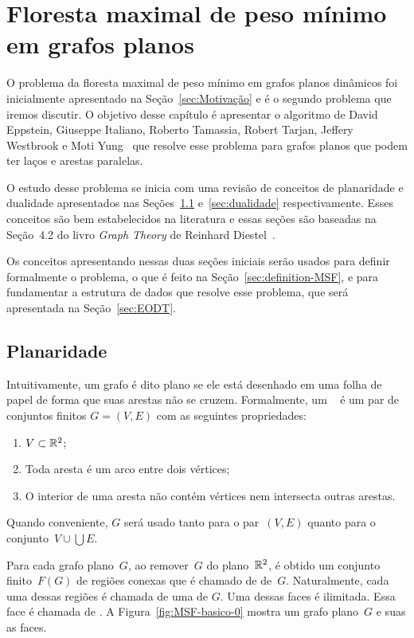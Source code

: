 \chapter{Floresta maximal de peso mínimo em grafos planos}
\label{sec:MSF}

O problema da floresta maximal de peso mínimo em grafos planos dinâmicos foi inicialmente apresentado na Seção~\ref{sec:Motivação} e é o segundo problema que iremos discutir.
O objetivo desse capítulo é apresentar o algoritmo de David Eppstein, Giuseppe Italiano, Roberto Tamassia, Robert Tarjan, Jeffery Westbrook e Moti Yung~\cite{EPPSTEIN-planar} que resolve esse problema para grafos planos que podem ter laços e arestas paralelas.

O estudo desse problema se inicia com uma revisão de conceitos de planaridade e dualidade apresentados nas Seções~\ref{sec:planaridade} e~\ref{sec:dualidade} respectivamente.
Esses conceitos são bem estabelecidos na literatura e essas seções são baseadas na Seção~4.2 do livro \textit{Graph Theory} de Reinhard Diestel~\cite{Diestel}.

Os conceitos apresentando nessas duas seções iniciais serão usados para definir formalmente o problema, o que é feito na Seção~\ref{sec:definition-MSF}, e para fundamentar a estrutura de dados que resolve esse problema, que será apresentada na Seção~\ref{sec:EODT}.

\section{Planaridade}
\label{sec:planaridade}

Intuitivamente, um grafo é dito plano se ele está desenhado em uma folha de papel de forma que suas arestas não se cruzem.
Formalmente, um ~\cite{Diestel} é um par de conjuntos finitos $G = (V, E)$ com as seguintes propriedades:
\begin{enumerate}
\item $V\subset \mathbb{R}^2$;
\item Toda aresta é um arco entre dois vértices;
\item O interior de uma aresta não contém vértices nem intersecta outras arestas.
\end{enumerate}
Quando conveniente, $G$ será usado tanto para o par~$(V ,E)$ quanto para o conjunto~${V\cup\bigcup E}$.

Para cada grafo plano~$G$, ao remover~$G$ do plano~$\mathbb{R}^2$, é obtido um conjunto finito~$F(G)$ de regiões conexas que é chamado de  de~$G$.
Naturalmente, cada uma dessas regiões é chamada de uma  de $G$.
Uma dessas faces é ilimitada.
Essa face é chamada de .
A Figura~\ref{fig:MSF-basico-0} mostra um grafo plano~$G$ e suas as faces.

